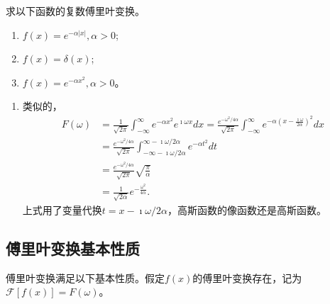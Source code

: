 \begin{examplebox}{
求以下函数的复数傅里叶变换。
\begin{enumerate}
    \item $f(x) = e^{-\alpha |x|}, \alpha > 0$;
    \item $f(x) = \delta (x)$;
    \item $f(x) = e^{-\alpha x^2}, \alpha > 0$。
\end{enumerate}
}
\begin{enumerate}
    \item 类似的，  
    \begin{align}
        F(\omega) &=\frac{1}{\sqrt{2 \pi}} \int_{-\infty}^{\infty} e^{-\alpha x^2} e^{\imath \omega x} d x \nonumber
        = \frac{ e^{-\omega^2 / 4\alpha }}{\sqrt{2 \pi}} \int_{-\infty}^{\infty} e^{-\alpha  \left( x - \frac{\imath \omega}{2\alpha} \right)^2}  d x
        \nonumber
        \\
        & = \frac{ e^{-\omega^2 / 4\alpha }}{\sqrt{2 \pi}} \int_{-\infty - \imath \omega / 2\alpha}^{\infty - \imath \omega / 2\alpha} e^{-\alpha t^2} dt
        \nonumber
        \\
        & = \frac{ e^{-\omega^2 / 4\alpha }}{\sqrt{2 \pi}} \sqrt{\frac{\pi}{\alpha}} 
        \nonumber
        \\
            & = \frac{1}{\sqrt{2\alpha}} e^{- \frac{\omega^2}{4\alpha}} \nonumber .
    \end{align}
    上式用了变量代换$t = x - \imath \omega /2 \alpha$，高斯函数的像函数还是高斯函数。
\end{enumerate}
\end{examplebox}


\subsection{傅里叶变换基本性质}
傅里叶变换满足以下基本性质。假定$f(x)$的傅里叶变换存在，记为$\mathcal{F}[f(x)] = F(\omega)$。

